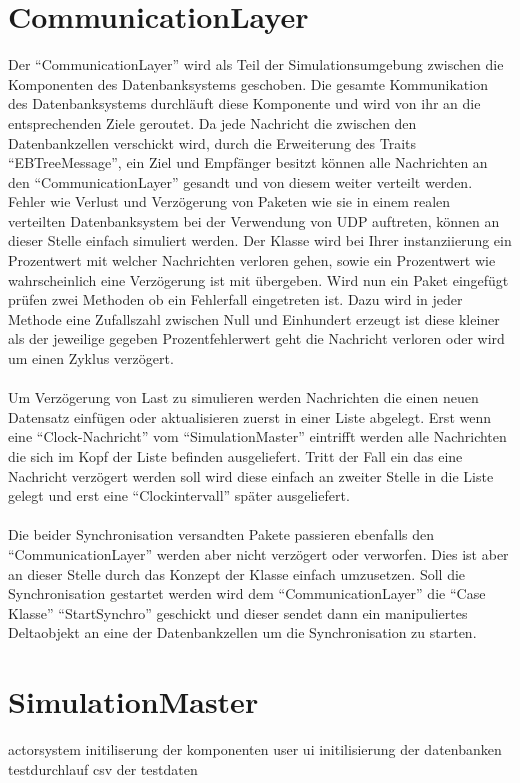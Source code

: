 \documentclass[a4paper,11pt,oneside,%
headsepline,												%
footsepline,												%
bibtotocnumbered									%
]{scrreprt}
\begin{document}
\section{CommunicationLayer}
Der \enquote{CommunicationLayer} wird als Teil der Simulationsumgebung zwischen die Komponenten des Datenbanksystems geschoben. Die gesamte Kommunikation des Datenbanksystems durchläuft diese Komponente und wird von ihr an die entsprechenden Ziele geroutet. Da jede Nachricht die zwischen den Datenbankzellen verschickt wird, durch die Erweiterung des Traits \enquote{EBTreeMessage}, ein Ziel und Empfänger besitzt können alle Nachrichten an den \enquote{CommunicationLayer} gesandt  und von diesem weiter verteilt werden. Fehler wie Verlust und Verzögerung von Paketen wie sie in einem realen verteilten Datenbanksystem bei der Verwendung von UDP auftreten, können an dieser Stelle einfach simuliert werden. Der Klasse wird bei Ihrer instanziierung ein Prozentwert mit welcher Nachrichten verloren gehen, sowie ein Prozentwert wie wahrscheinlich eine Verzögerung ist mit übergeben. Wird nun ein Paket eingefügt prüfen zwei Methoden ob ein Fehlerfall eingetreten ist. Dazu wird in jeder Methode eine Zufallszahl zwischen Null und Einhundert erzeugt ist diese kleiner als der jeweilige gegeben Prozentfehlerwert geht die Nachricht verloren oder wird um einen Zyklus verzögert.\\\\
Um Verzögerung von Last zu simulieren werden Nachrichten die einen neuen Datensatz einfügen oder aktualisieren zuerst in einer Liste abgelegt. Erst wenn eine \enquote{Clock-Nachricht} vom \enquote{SimulationMaster} eintrifft werden alle Nachrichten die sich im Kopf der Liste befinden ausgeliefert. Tritt der Fall ein das eine Nachricht verzögert werden soll wird diese einfach an zweiter Stelle in die Liste gelegt und erst eine \enquote{Clockintervall} später ausgeliefert.\\\\
Die beider Synchronisation versandten Pakete passieren ebenfalls den \enquote{CommunicationLayer} werden aber nicht verzögert oder verworfen. Dies ist aber an dieser Stelle durch das Konzept der Klasse einfach umzusetzen. Soll die Synchronisation gestartet werden wird dem \enquote{CommunicationLayer} die \enquote{Case Klasse} \enquote{StartSynchro} geschickt und dieser sendet dann ein manipuliertes Deltaobjekt an eine der Datenbankzellen um die Synchronisation zu starten.

\section{SimulationMaster}
actorsystem
initiliserung der komponenten
user ui
initilisierung der datenbanken
testdurchlauf
csv der testdaten
\end{document}

